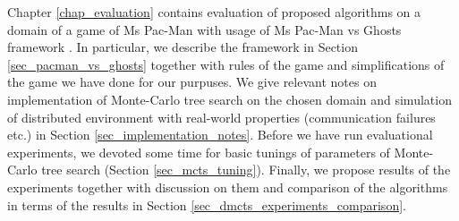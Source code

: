 Chapter \ref{chap_evaluation} contains evaluation of proposed algorithms on a domain of a
game of Ms Pac-Man with usage of Ms Pac-Man vs Ghosts framework \cite{PacmanVsGhosts}. In
particular, we describe the framework in Section \ref{sec_pacman_vs_ghosts} together with rules
of the game and simplifications of the game we have done for our purpuses. We give relevant
notes on implementation of Monte-Carlo tree search on the chosen domain and simulation of
distributed environment with real-world properties (communication failures etc.) in Section 
\ref{sec_implementation_notes}. Before we have run evaluational experiments, we devoted some time for
basic tunings of parameters of Monte-Carlo tree search (Section \ref{sec_mcts_tuning}).
Finally, we propose results of the experiments together with discussion on them and comparison
of the algorithms in terms of the results in Section \ref{sec_dmcts_experiments_comparison}.

